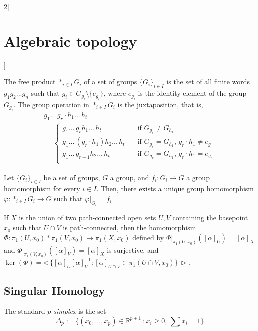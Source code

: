 \documentclass[../../../main_math.tex]{subfiles}
\begin{document}
\begin{multicols}{2}[\section{Algebraic topology}]
  \begin{definition}
    The free product $*_{i\in I}G_i$ of a set of groups $\{G_i\}_{i\in I}$ is the set of all finite words $g_1g_2...g_n$ such that $g_i\in G_{g_i}\setminus \{e_{g_i}\}$, where $e_{g_i}$ is the identity element of the group $G_{g_i}$.  The group operation in $*_{i\in I}G_i$ is the juxtaposition, that is,
    \begin{multline*}
      g_1...\,g_r \cdot h_1...\,h_t=\\
      = \begin{cases}
        g_1...\,g_rh_1...\,h_t            & \quad\text{if  } G_{g_r}\neq G_{h_1}                                   \\
        g_1...\,(g_r\cdot h_1)h_2...\,h_t & \quad\text{if } G_{g_r} = G_{h_1} \text{,  } g_r\cdot h_1 \neq e_{g_r} \\
        g_1...\,g_{r-1}h_2...\,h_t        & \quad\text{if } G_{g_r} = G_{h_1} \text{,  } g_r\cdot h_1 = e_{g_r}    \\
      \end{cases}
    \end{multline*}
  \end{definition}

  \begin{proposition}
    Let $\{G_i\}_{i\in I}$ be a set of groups, $G$ a group, and $f_i: G_i \to G$ a group homomorphism for every $i\in I$. Then, there exists a unique group homomorphism $\varphi: *_{i\in I}G_i \to G$ such that $\left.\varphi \right|_{G_i}=f_i$
  \end{proposition}

  \begin{theorem}
    If $X$ is the union of two path-connected open sets $U, V$ containing the basepoint $x_0$ such that $U\cap V$ is path-connected, then the homomorphism $\Phi : \pi_1(U, x_0)*\pi_1(V, x_0)\to \pi_1(X, x_0)$ defined by $\left.\Phi \right|_{\pi_1(U, x_0)}([\alpha]_U)=[\alpha]_X$ and  $\left.\Phi \right|_{\pi_1(V, x_0)}([\alpha]_V)=[\alpha]_X$ is surjective, and $\ker(\Phi)=\triangleleft\,\{[\alpha]_U[\alpha]_V^{-1} : [\alpha]_{U\cap V} \in \pi_1(U\cap V, x_0)\}\,\triangleright$.
  \end{theorem}

  \subsection{Singular Homology}

  \begin{definition}
    The standard $p$\emph{-simplex} is the set $$\Delta_p:=\{(x_0, ... , x_p)\in \mathbb{R}^{p+1}\ : x_i\geq0, \, \sum x_i =1\}$$
  \end{definition}


\end{multicols}
\end{document}
